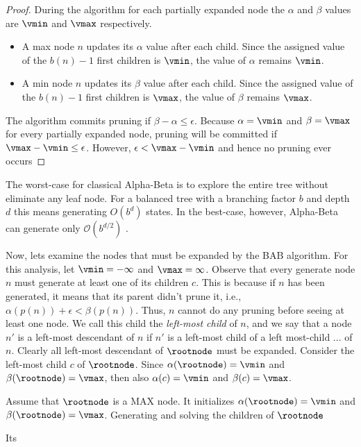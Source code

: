 \begin{proof}
During the algorithm for each partially expanded node the $\alpha$ and $\beta$ values are $\vmin$ and $\vmax$ respectively.
\begin{itemize}
  \item A max node $n$ updates its $\alpha$ value after each child. Since the assigned value of the $b(n)-1$ first children is $\vmin$, the value of $\alpha$ remains $\vmin$.
  \item A min node $n$ updates its $\beta$ value after each child. Since the assigned value of the $b(n)-1$ first children is $\vmax$, the value of $\beta$ remains $\vmax$.
\end{itemize}
The algorithm commits pruning if $\beta - \alpha \leq \epsilon$. Because $\alpha = \vmin$ and $\beta = \vmax$ for every partially expanded node, pruning will be committed if $\vmax - \vmin \leq \epsilon$. However, $\epsilon < \vmax - \vmin$ and hence no pruning ever occurs
\end{proof}







The worst-case for classical Alpha-Beta is to explore the entire tree without eliminate any leaf node. For a balanced tree with a branching factor $b$ and depth $d$ this means generating $O(b^d)$ states. In the best-case, however, Alpha-Beta can generate only $\mathcal{O}(b^{d/2})$ \cite{knuth1975analysis}. 


Now, lets examine the nodes that must be expanded by the BAB algorithm. 
For this analysis, let $\vmin=-\infty$ and $\vmax=\infty$. 
Observe that every generate node $n$ must generate at least one of its children $c$. This is because if $n$ has been generated, it means that its parent didn't prune it, i.e., $\alpha(p(n))+\epsilon<\beta(p(n))$. 
Thus, $n$ cannot do any pruning before seeing at least one node. 
We call this child the \emph{left-most child} of $n$,
and we say that a node $n'$ is a left-most descendant of $n$
if $n'$ is a left-most child of a left most-child ... of $n$. 
Clearly all left-most descendant of $\rootnode$ must be expanded. 
Consider the left-most child $c$ of $\rootnode$. 
Since $\alpha(\rootnode)=\vmin$ and $\beta(\rootnode)=\vmax$, 
then also $\alpha(c)=\vmin$ and $\beta(c)=\vmax$. 

Assume that $\rootnode$ is a MAX node. 
It initializes $\alpha(\rootnode)=\vmin$ and $\beta(\rootnode)=\vmax$. 
Generating and solving the children of $\rootnode$


Its 


